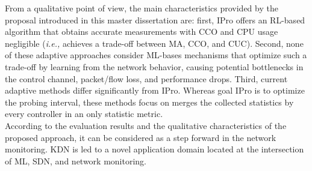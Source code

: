 From a qualitative point of view, the main characteristics provided by the proposal introduced in this master dissertation are: first, IPro offers an RL-based algorithm that obtains accurate measurements with CCO and CPU usage negligible (\textit{i.e.,} achieves a trade-off between MA, CCO, and CUC). Second, none of these adaptive approaches consider ML-bases mechanisms that optimize such a trade-off by learning from the network behavior, causing potential bottlenecks in the control channel, packet/flow loss, and performance drops. Third, current adaptive methods differ significantly from IPro. Whereas goal IPro is to optimize the probing interval, these methods focus on merges the collected statistics by every controller in an only statistic metric.\\

According to the evaluation results and the qualitative characteristics of the proposed approach, it can be considered as a step forward in the network monitoring. KDN is led to a novel application domain located at the intersection of ML, SDN, and network monitoring.